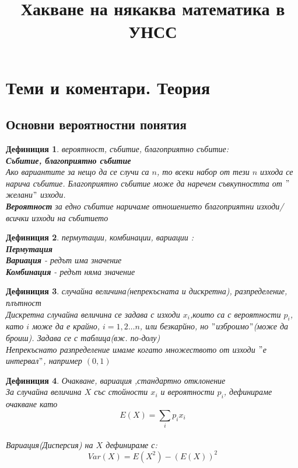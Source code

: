 \documentclass{article}
\title{Хакване на някаква математика в УНСС}
\newtheorem{definition}{Дефиниция}
\begin{document}
	\maketitle
	
	\section{Теми и коментари. Теория}
	
	\subsection{Основни вероятностни понятия}
	
	\begin{definition}  вероятност, събитие, благоприятно събитие: \\
		\textbf{Събитие, благоприятно събитие} \\ Ако вариантите за нещо да се случи са $n$, то всеки набор от тези $n$ изхода се нарича събитие. Благоприятно събитие може да наречем съвкупността от $"$желани$"$ изходи.\\
		\textbf{Вероятност} за едно събитие наричаме отношението благоприятни изходи/всички изходи на събитието\\

\end{definition}
	
	
\begin{definition} пермутации, комбинации, вариации : \\
	\textbf{Пермутация} \\
	\textbf{Вариация} - редът има значение\\
	\textbf{Комбинация} - редът няма значение  \\
	
\end{definition}


\begin{definition}
	случайна величина(непрекъсната и дискретна), разпределение, плътност \\
	 Дискретна случайна величина се задава с изходи $x_i$,които са с вероятности $p_i$, като $i$ може да е крайно, $i = 1,2 \dots n$, или безкарйно, но $"$изброимо$"$(може да броиш). Задава се с таблица(вж. по-долу)\\
	Непрекъснато разпределение имаме когато множеството от изходи $"$е интервал$"$, например $(0,1)$ 
\end{definition}

\begin{definition}
	Очакване, вариация ,стандартно отклонение\\
За случайна величина $X$ със стойности $x_i$ и вероятности $p_i$, дефинираме очакване като 
$$E(X) = \sum_i p_i x_i $$ 
\\
Вариация(Дисперсия) на $X$ дефинираме с:
$$ Var(X) = E(X^2) - (E(X))^2 $$
\end{definition}
	
\end{document}
